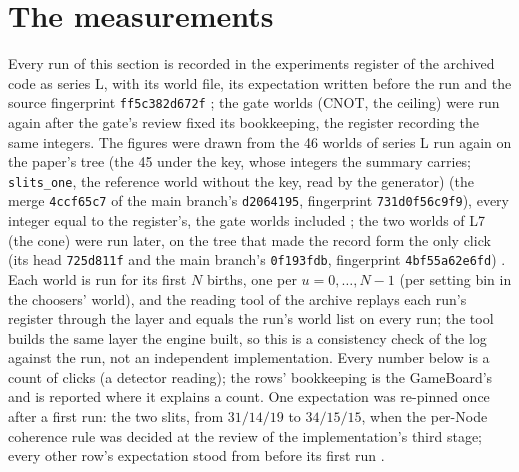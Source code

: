 \documentclass[11pt]{article}
\theoremstyle{definition}
\begin{document}
\section{The measurements}\label{sec:measure}

Every run of this section is recorded in the experiments register of the
archived code as series L, with its world file, its expectation written
before the run and the source fingerprint \texttt{ff5c382d672f}
\cite{register}; the gate worlds (CNOT, the ceiling) were run again after
the gate's review fixed its bookkeeping, the register recording the same
integers. The figures were drawn from the 46 worlds of series L run
again on the paper's tree (the 45 under the key, whose integers the
summary carries; \texttt{slits\_one}, the reference world without the
key, read by the generator) (the merge \texttt{4ccf65c7} of the main branch's
\texttt{d2064195}, fingerprint \texttt{731d0f56c9f9}), every integer
equal to the register's, the gate worlds included \cite{checks}; the two
worlds of L7 (the cone) were run later, on the tree that made the record
form the only click (its head \texttt{725d811f} and the main branch's
\texttt{0f193fdb}, fingerprint \texttt{4bf55a62e6fd}) \cite{register}. Each
world is run for its first $N$ births, one per $u = 0, \dots, N-1$ (per
setting bin in the choosers' world), and the
reading tool of the archive replays each run's register through the
layer and equals the run's world list on every run; the tool builds the
same layer the engine built, so this is a consistency check of the log
against the run, not an independent implementation. Every number below
is a count of clicks (a detector reading); the rows' bookkeeping is the
GameBoard's and is reported where it explains a count. One expectation
was re-pinned once after a first run: the two slits, from $31/14/19$ to
$34/15/15$, when the per-Node coherence rule was decided at the review of
the implementation's third stage; every other row's expectation stood
from before its first run \cite{register,log}.
\end{document}
